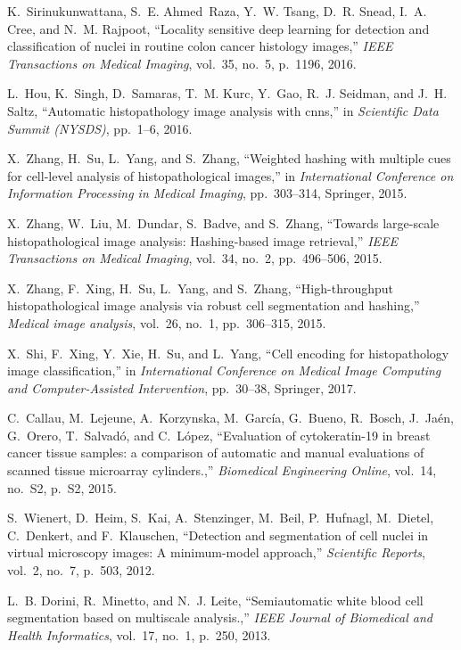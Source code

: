 \documentclass[journal]{IEEEtran}
\begin{document}
\begin{thebibliography}{10}
K.~Sirinukunwattana, S.~E. Ahmed~Raza, Y.~W. Tsang, D.~R. Snead, I.~A. Cree,
  and N.~M. Rajpoot, ``Locality sensitive deep learning for detection and
  classification of nuclei in routine colon cancer histology images,'' {\em
  IEEE Transactions on Medical Imaging}, vol.~35, no.~5, p.~1196, 2016.

L.~Hou, K.~Singh, D.~Samaras, T.~M. Kurc, Y.~Gao, R.~J. Seidman, and J.~H.
  Saltz, ``Automatic histopathology image analysis with cnns,'' in {\em
  Scientific Data Summit (NYSDS)}, pp.~1--6, 2016.

X.~Zhang, H.~Su, L.~Yang, and S.~Zhang, ``Weighted hashing with multiple cues
  for cell-level analysis of histopathological images,'' in {\em International
  Conference on Information Processing in Medical Imaging}, pp.~303--314,
  Springer, 2015.

X.~Zhang, W.~Liu, M.~Dundar, S.~Badve, and S.~Zhang, ``Towards large-scale histopathological image analysis: Hashing-based image retrieval,''{\em
    IEEE Transactions on Medical Imaging}, vol.~34, no.~2, pp.~496--506, 2015.

X.~Zhang, F.~Xing, H.~Su, L.~Yang, and S.~Zhang, ``High-throughput histopathological image analysis via robust cell segmentation and hashing,''{\em
    Medical image analysis}, vol.~26, no.~1, pp.~306--315, 2015.

X.~Shi, F.~Xing, Y.~Xie, H.~Su, and L.~Yang, ``Cell encoding for histopathology
  image classification,'' in {\em International Conference on Medical Image
  Computing and Computer-Assisted Intervention}, pp.~30--38, Springer, 2017.

C.~Callau, M.~Lejeune, A.~Korzynska, M.~García, G.~Bueno, R.~Bosch, J.~Jaén,
  G.~Orero, T.~Salvadó, and C.~López, ``Evaluation of cytokeratin-19 in
  breast cancer tissue samples: a comparison of automatic and manual
  evaluations of scanned tissue microarray cylinders.,'' {\em Biomedical
  Engineering Online}, vol.~14, no.~S2, p.~S2, 2015.

S.~Wienert, D.~Heim, S.~Kai, A.~Stenzinger, M.~Beil, P.~Hufnagl, M.~Dietel,
  C.~Denkert, and F.~Klauschen, ``Detection and segmentation of cell nuclei in
  virtual microscopy images: A minimum-model approach,'' {\em Scientific
  Reports}, vol.~2, no.~7, p.~503, 2012.

L.~B. Dorini, R.~Minetto, and N.~J. Leite, ``Semiautomatic white blood cell
  segmentation based on multiscale analysis.,'' {\em IEEE Journal of Biomedical
  and Health Informatics}, vol.~17, no.~1, p.~250, 2013.


\end{thebibliography}
\end{document}
